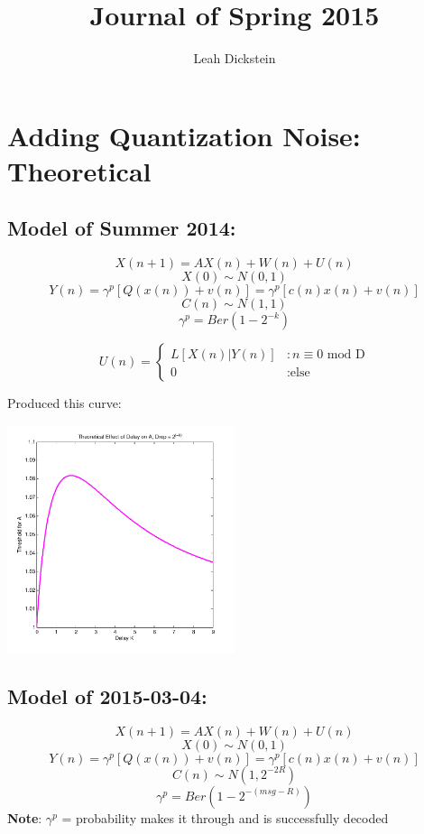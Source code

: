 \documentclass[leqno,twocolumn]{article}
\begin{document}
\onecolumn
\title{Journal of Spring 2015}
\author{Leah Dickstein}

\maketitle

\tableofcontents

\section{Adding Quantization Noise: Theoretical}
\subsection{Model of Summer 2014:}
\[ X(n+1) = AX(n) + W(n) + U(n) \]
\[ X(0) \sim N(0, 1) \]
\[ Y(n) = \gamma^p [ Q(x(n)) + v(n)] = \gamma^p [ c(n)x(n) + v(n) ] \]
\[ C(n) \sim N(1, 1) \]
\[ \gamma^p = Ber(1 - 2^{-k}) \]

 \begin{displaymath}
   U(n) = \left\{
     \begin{array}{lr}
       L[X(n) | Y(n) ] & : n \equiv 0 \text{ mod D}\\
       0 & : \text{else}
     \end{array}
   \right.
\end{displaymath} 

Produced this curve:
\begin{center}
\includegraphics[width=0.5\textwidth]{summer_theoretical}
\end{center}

\subsection{Model of 2015-03-04:}
\[ X(n+1) = AX(n) + W(n) + U(n) \]
\[ X(0) \sim N(0, 1) \]
\[ Y(n) = \gamma^p [ Q(x(n)) + v(n)] = \gamma^p [ c(n)x(n) + v(n) ] \]
\[ C(n) \sim N(1, 2^{-2R}) \]
\[ \gamma^p = Ber(1 - 2^{-(msg-R)}) \]
\textbf{Note}: $\gamma^p$ = probability makes it through and is successfully decoded\\
\end{document}
